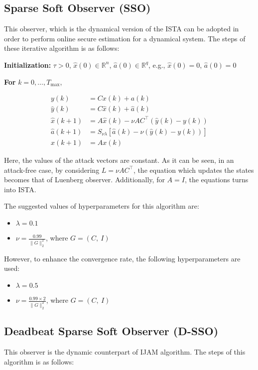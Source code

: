 \subsection{Sparse Soft Observer (SSO)}
This observer, which is the dynamical version of the ISTA can be adopted in order to perform online secure estimation for a dynamical system. The steps of these iterative algorithm is as follows:

\textbf{Initialization:} \(\tau > 0\), \(\hat{x}(0) \in \mathbb{R}^{n}\), \(\hat{a}(0) \in \mathbb{R}^{q}\), e.g., \(\hat{x}(0) = 0\), \(\hat{a}(0) = 0\)

\textbf{For} \( k = 0, \dots, T_{\max} \),

\begin{align}
    y(k) &= Cx(k) + a(k) \\
    \hat{y}(k) &= C\hat{x}(k) + \hat{a}(k) \\
    \hat{x}(k+1) &= A\hat{x}(k) - \nu A C^\top (\hat{y}(k) - y(k)) \\
    \hat{a}(k+1) &= S_{\nu\lambda} [\hat{a}(k) - \nu (\hat{y}(k) - y(k))] \\
    x(k+1) &= A x(k)
\end{align}

Here, the values of the attack vectors are constant. As it can be seen, in an attack-free case, by considering $L =\nu A C^\top$, the equation which updates the states becomes that of Luenberg observer. Additionally, for $A = I$, the equations turns into ISTA.

The suggested values of hyperparameters for this algorithm are:

\begin{itemize}
	\item $\lambda = 0.1$
	\item $\nu = \frac{0.99}{\|G\|_2^2}$, where $G = (C,\ I)$
\end{itemize} 

However, to enhance the convergence rate, the following hyperparameters are used:
\begin{itemize}
	\item $\lambda = 0.5$
	\item $\nu = \frac{0.99 \times 2}{\|G\|_2^2}$, where $G = (C,\ I)$
\end{itemize} 

\subsection{Deadbeat Sparse Soft Observer (D-SSO)}
This observer is the dynamic counterpart of IJAM algorithm. The steps of this algorithm is as follows:

